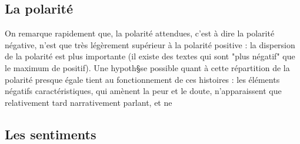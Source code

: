 \documentclass[12pt,a4paper,oneside,titlepage]{book} %
\begin{document}
\subsection{La polarité}
On remarque rapidement que, la polarité attendues, c'est à dire la polarité négative, n'est que très légèrement supérieur à la polarité positive :  la dispersion de la polarité est plus importante (il existe des textes qui sont "plus négatif" que le maximum de positif). 
Une hypoth§se possible quant à cette répartition de la polarité presque égale tient au fonctionnement de ces histoires : les éléments négatifs caractéristiques, qui amènent la peur et le doute, n'apparaissent que relativement tard narrativement parlant, et ne 
	

\subsection{Les sentiments}
\end{document}
